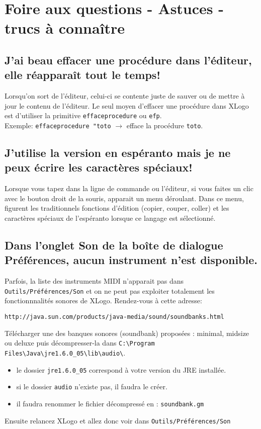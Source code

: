 \chapter{Foire aux questions - Astuces - trucs à connaître}
\section{J'ai beau effacer une procédure dans l'éditeur, elle réapparaît  tout le temps!}
 Lorsqu'on sort de l'éditeur, celui-ci se contente juste de sauver ou de mettre à jour le contenu de l'éditeur. Le seul moyen d'effacer une procédure dans XLogo est d'utiliser la primitive \texttt{effaceprocedure} ou \texttt{efp}. \\
 Exemple: \texttt{effaceprocedure "toto} $\longrightarrow$ efface la procédure \texttt{toto}.
 \section{J'utilise la version en espéranto mais je ne peux écrire les caractères spéciaux!}
 Lorsque vous tapez dans la ligne de commande ou l'éditeur, si vous faites un clic avec le bouton droit de la souris, apparait un menu déroulant. Dans ce menu, figurent les traditionnels fonctions d'édition (copier, couper, coller) et les caractères spéciaux de l'espéranto lorsque ce langage est sélectionné.
 \section{Dans l'onglet Son de la boîte de dialogue Préférences, aucun instrument n'est disponible.}
Parfois, la liste des instruments MIDI n'apparait pas dans \texttt{Outils/Préférences/Son} et on ne peut pas exploiter totalement les fonctionnnalités sonores de XLogo. Rendez-vous à cette adresse:
\begin{center}
 \texttt{http://java.sun.com/products/java-media/sound/soundbanks.html}
\end{center}
Télécharger une des banques sonores (soundbank) proposées : minimal, midsize ou deluxe puis décompresser-la dans \texttt{C:\textbackslash Program Files\textbackslash Java\textbackslash jre1.6.0\_05\textbackslash lib\textbackslash audio\textbackslash}.\\
\begin{itemize}
 \item le dossier \texttt{jre1.6.0\_05} correspond à votre version du JRE installée.
 \item si le dossier \texttt{audio} n'existe pas, il faudra le créer.
 \item il faudra renommer le fichier décompressé en : \texttt{soundbank.gm}
\end{itemize}
\vspace{0.2cm}
\noindent Ensuite relancez XLogo et allez donc voir dans \texttt{Outils/Préférences/Son }

